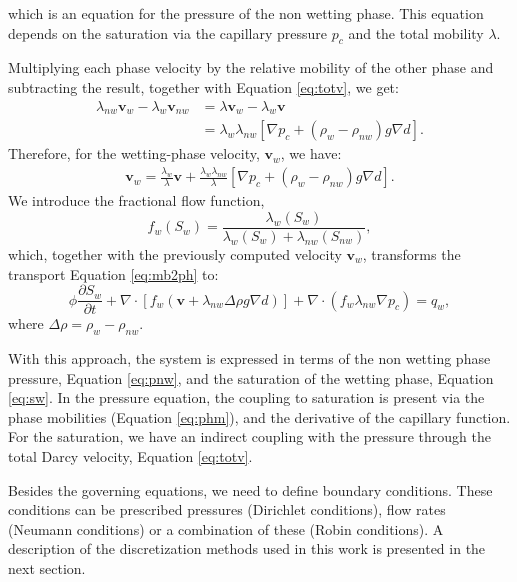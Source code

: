 \documentclass[12pt]{article}
\begin{document}
which is an equation for the pressure of the non wetting phase. This equation depends on the saturation via the capillary 
pressure $p_c$ and the total mobility $\lambda$.\par
Multiplying each phase velocity by the relative mobility of the other phase and subtracting the result, together with Equation \eqref{eq:totv}, we get:
\begin{align*}
\lambda_{nw}\mathbf{v}_w-\lambda_w\mathbf{v}_{nw}&=\lambda\mathbf{v}_w-\lambda_w\mathbf{v}\\
&=\lambda_w\lambda_{nw} [\nabla p_c+(\rho_w-\rho_{nw})g\nabla d].
\end{align*}
Therefore, for the wetting-phase velocity, $\mathbf{v}_w$, we have:
\begin{align}\label{eq:vw}
\mathbf{v}_w=\frac{\lambda_w}{\lambda}\mathbf{v}+\frac{\lambda_w\lambda_{nw}}{\lambda} [\nabla p_c+(\rho_w-\rho_{nw})g\nabla d].
\end{align}
We introduce the fractional flow function, $$f_{w}(S_w)=\frac{\lambda_{w}(S_w)}{\lambda_{w}(S_w)+\lambda_{nw}(S_{nw})},$$ which, 
together with the previously computed velocity $\mathbf{v}_w$, transforms the transport Equation \eqref{eq:mb2ph} to:
\begin{equation}\label{eq:sw}
 \phi\frac{\partial {S}_{w}}{\partial t}+\nabla \cdot [f_w( \mathbf{v}+\lambda_{nw}\Delta  \rho g\nabla d)]+\nabla \cdot(f_w\lambda_{nw}\nabla p_c)= q_w,
\end{equation}
where $\Delta \rho= \rho_w-\rho_{nw}.$ \par
With this approach, the system is expressed in terms of the non wetting phase pressure, Equation \eqref{eq:pnw}, and the saturation of the wetting phase, Equation \eqref{eq:sw}.
In the pressure equation,
the coupling to saturation is present via the phase mobilities (Equation \eqref{eq:phm}), and the derivative of the capillary 
function. For the saturation, we have an indirect
coupling with the pressure through the total Darcy velocity, Equation \eqref{eq:totv}. \par Besides the governing equations, 
we need to define boundary conditions. These conditions can be prescribed pressures 
(Dirichlet conditions), flow rates (Neumann conditions) or a combination of these (Robin conditions).  A description of the 
discretization methods used in this work is presented in the next section. 
\end{document}
